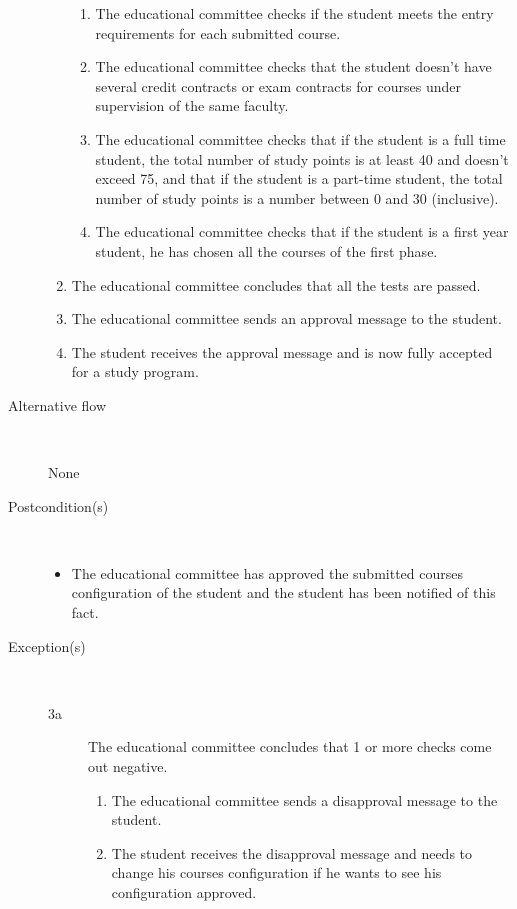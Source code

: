\begin{description}
\begin{enumerate}
	  	\begin{enumerate}
	  	  \item The educational committee checks if the student meets the entry
	  	  requirements for each submitted course.
	  	  \item The educational committee checks that the student doesn't have
	  	  several credit contracts or exam contracts for courses under supervision
	  	  of the same faculty.
	  	  \item The educational committee checks that if the student is a full time
	  	  student, the total number of study points is at least 40 and doesn't
	  	  exceed 75, and that if the student is a part-time student, the total
	  	  number of study points is a number between 0 and 30 (inclusive).
	  	  \item The educational committee checks that if the student is a first year
	  	  student, he has chosen all the courses of the first phase.
	  	\end{enumerate}
	  	\item The educational committee concludes that all the tests are passed.
	  	\item The educational committee sends an approval message to the student.
	  	\item The student receives the approval message and is now fully accepted
	  	for a study program.
	\end{enumerate}
	\item[Alternative flow] \
		\par None
	\item[Postcondition(s)] \ 
	\begin{itemize}
		\item The educational committee has approved the submitted courses
		configuration of the student and the student has been notified of this fact.
	\end{itemize}
	\item[Exception(s)] \ 
	\begin{description}
		\item[3a] The educational committee concludes that 1 or more checks come out
		negative.
		\begin{enumerate}
			\item The educational committee sends a disapproval message to the student.
			\item The student receives the disapproval message and needs to change his
			courses configuration if he wants to see his configuration approved.
		\end{enumerate}
	\end{description}
\end{description}
